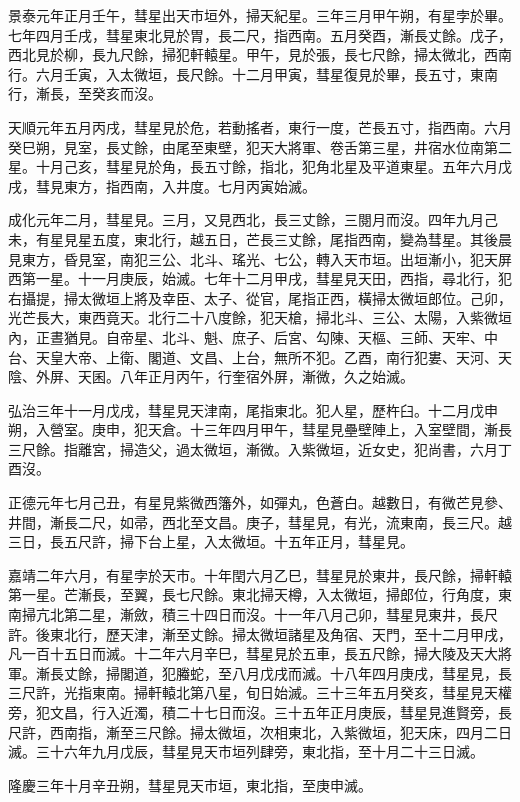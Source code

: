 \begin{pinyinscope}
景泰元年正月壬午，彗星出天市垣外，掃天紀星。三年三月甲午朔，有星孛於畢。七年四月壬戌，彗星東北見於胃，長二尺，指西南。五月癸酉，漸長丈餘。戊子，西北見於柳，長九尺餘，掃犯軒轅星。甲午，見於張，長七尺餘，掃太微北，西南行。六月壬寅，入太微垣，長尺餘。十二月甲寅，彗星復見於畢，長五寸，東南行，漸長，至癸亥而沒。

天順元年五月丙戌，彗星見於危，若動搖者，東行一度，芒長五寸，指西南。六月癸巳朔，見室，長丈餘，由尾至東壁，犯天大將軍、卷舌第三星，井宿水位南第二星。十月己亥，彗星見於角，長五寸餘，指北，犯角北星及平道東星。五年六月戊戌，彗見東方，指西南，入井度。七月丙寅始滅。

成化元年二月，彗星見。三月，又見西北，長三丈餘，三閱月而沒。四年九月己未，有星見星五度，東北行，越五日，芒長三丈餘，尾指西南，變為彗星。其後晨見東方，昏見室，南犯三公、北斗、瑤光、七公，轉入天市垣。出垣漸小，犯天屏西第一星。十一月庚辰，始滅。七年十二月甲戌，彗星見天田，西指，尋北行，犯右攝提，掃太微垣上將及幸臣、太子、從官，尾指正西，橫掃太微垣郎位。己卯，光芒長大，東西竟天。北行二十八度餘，犯天槍，掃北斗、三公、太陽，入紫微垣內，正晝猶見。自帝星、北斗、魁、庶子、后宮、勾陳、天樞、三師、天牢、中台、天皇大帝、上衛、閣道、文昌、上台，無所不犯。乙酉，南行犯婁、天河、天陰、外屏、天囷。八年正月丙午，行奎宿外屏，漸微，久之始滅。

弘治三年十一月戊戌，彗星見天津南，尾指東北。犯人星，歷杵臼。十二月戊申朔，入營室。庚申，犯天倉。十三年四月甲午，彗星見壘壁陣上，入室壁間，漸長三尺餘。指離宮，掃造父，過太微垣，漸微。入紫微垣，近女史，犯尚書，六月丁酉沒。

正德元年七月己丑，有星見紫微西籓外，如彈丸，色蒼白。越數日，有微芒見參、井間，漸長二尺，如帚，西北至文昌。庚子，彗星見，有光，流東南，長三尺。越三日，長五尺許，掃下台上星，入太微垣。十五年正月，彗星見。

嘉靖二年六月，有星孛於天市。十年閏六月乙巳，彗星見於東井，長尺餘，掃軒轅第一星。芒漸長，至翼，長七尺餘。東北掃天樽，入太微垣，掃郎位，行角度，東南掃亢北第二星，漸斂，積三十四日而沒。十一年八月己卯，彗星見東井，長尺許。後東北行，歷天津，漸至丈餘。掃太微垣諸星及角宿、天門，至十二月甲戌，凡一百十五日而滅。十二年六月辛巳，彗星見於五車，長五尺餘，掃大陵及天大將軍。漸長丈餘，掃閣道，犯螣蛇，至八月戊戌而滅。十八年四月庚戌，彗星見，長三尺許，光指東南。掃軒轅北第八星，旬日始滅。三十三年五月癸亥，彗星見天權旁，犯文昌，行入近濁，積二十七日而沒。三十五年正月庚辰，彗星見進賢旁，長尺許，西南指，漸至三尺餘。掃太微垣，次相東北，入紫微垣，犯天床，四月二日滅。三十六年九月戊辰，彗星見天市垣列肆旁，東北指，至十月二十三日滅。

隆慶三年十月辛丑朔，彗星見天市垣，東北指，至庚申滅。


\end{pinyinscope}
